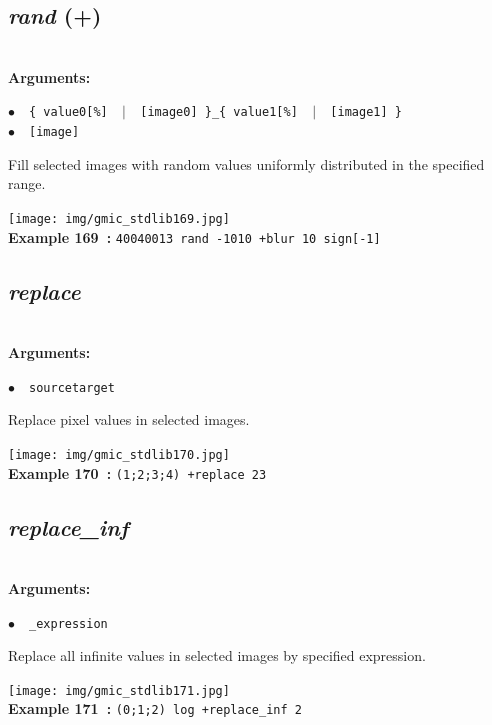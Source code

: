 \documentclass[a4paper,10.5pt,twoside]{book}
\def\comma{\discretionary{,}{}{,}}
\newcommand{\Cb}[1]{\textcolor{cb}{#1}}
\begin{document}
\subsection{\emph{rand} (+)}\vspace*{-0.7em}
~\\\textbf{\Cb{Arguments: }}\begin{flushleft}
{\small \Cb{\hspace*{0.5cm}$\bullet$~~\texttt{\{ value0[\%] ~$|$~ [image0] \}{\comma}\_\{ value1[\%] ~$|$~ [image1] \}}}}~~~\\
{\small \Cb{\hspace*{0.5cm}$\bullet$~~\texttt{[image]}}}\end{flushleft}
Fill selected images with random values uniformly distributed in the specified range.
\begin{center}\texttt{[image: img/gmic\_stdlib169.jpg]}\\
{\footnotesize \textbf{Example 169~:} \texttt{400{\comma}400{\comma}1{\comma}3 rand -10{\comma}10 +blur 10 sign[-1]}}
\end{center}

\subsection{\emph{replace} }\vspace*{-0.7em}
~\\\textbf{\Cb{Arguments: }}\begin{flushleft}
{\small \Cb{\hspace*{0.5cm}$\bullet$~~\texttt{source{\comma}target}}}\end{flushleft}
Replace pixel values in selected images.
\begin{center}\texttt{[image: img/gmic\_stdlib170.jpg]}\\
{\footnotesize \textbf{Example 170~:} \texttt{(1;2;3;4) +replace 2{\comma}3}}
\end{center}

\subsection{\emph{replace\_inf} }\vspace*{-0.7em}
~\\\textbf{\Cb{Arguments: }}\begin{flushleft}
{\small \Cb{\hspace*{0.5cm}$\bullet$~~\texttt{\_expression}}}\end{flushleft}
Replace all infinite values in selected images by specified expression.
\begin{center}\texttt{[image: img/gmic\_stdlib171.jpg]}\\
{\footnotesize \textbf{Example 171~:} \texttt{(0;1;2) log +replace\_inf 2}}
\end{center}
\end{document}
